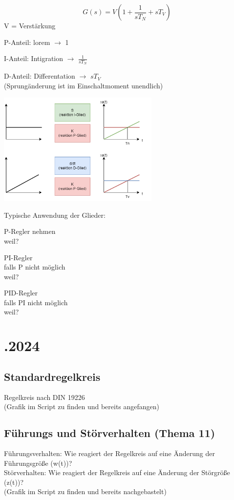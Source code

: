 \documentclass{article}
\begin{document}
\[
G(s) = V(1+ \frac{1}{sT_N}+ sT_V)
\]
V = Verstärkung
\begin{multicols}{3}
	P-Anteil: lorem $\rightarrow$  1

	\columnbreak
	I-Anteil: Intigration $\rightarrow$ $\frac{1}{sT_N}$

	\columnbreak
	D-Anteil: Differentation $\rightarrow$ $sT_V$ \\
	(Sprungänderung ist im Einschaltmoment unendlich)
\end{multicols}
\begin{center}
	\includegraphics[width=0.6\textwidth]{19_11_2024_reglungstechnik.png}
\end{center}

Typische Anwendung der Glieder: 
\begin{multicols}{3}
	P-Regler nehmen \\
	weil?

	\columnbreak
	PI-Regler \\
	falls P nicht möglich \\
	weil?

	\columnbreak
	PID-Regler \\
	falls PI nicht möglich \\
	weil?
\end{multicols}


\newpage
\section*{.2024}
\subsection*{Standardregelkreis}
Regelkreis nach DIN 19226 \\
(Grafik im Script zu finden und bereits angefangen)

\subsection*{Führungs und Störverhalten (Thema 11)}
Führungsverhalten: Wie reagiert der Regelkreis auf eine Änderung der Führungsgröße (w(t))? \\
Störverhalten: Wie reagiert der Regelkreis auf eine Änderung der Störgröße (z(t))? \\
(Grafik im Script zu finden und bereits nachgebastelt)
\end{document}

